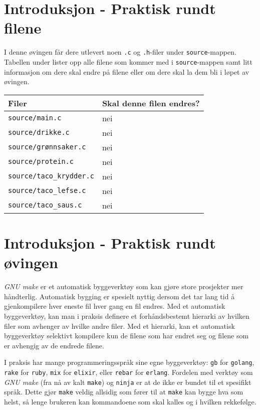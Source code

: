 \begin{alphasection}

\section{Introduksjon - Praktisk rundt filene}

I denne øvingen får dere utlevert noen \verb|.c| og \verb|.h|-filer under \verb|source|-mappen. Tabellen under lister opp alle filene som kommer med i \verb|source|-mappen samt litt informasjon om dere skal endre på filene eller om dere skal la dem bli i løpet av øvingen.

\begin{center}
 \begin{tabular}{|p{8.5cm} p{5.5cm}|} 
 \hline
 \textbf{Filer} & \textbf{Skal denne filen endres?}  \\ [0.5ex] 
 \hline\hline
  \verb|source/main.c| & nei  \\ 
 \hline
 \verb|source/drikke.c| & nei  \\ 
 \hline
 \verb|source/grønnsaker.c| & nei  \\ 
 \hline
 \verb|source/protein.c| & nei  \\ 
 \hline
 \verb|source/taco_krydder.c| & nei  \\
 \hline
 \verb|source/taco_lefse.c| & nei  \\ 
 \hline
  \verb|source/taco_saus.c| & nei  \\ 
 \hline
\end{tabular}
\end{center}

\section{Introduksjon - Praktisk rundt øvingen}

 \textit{GNU make} er et automatisk byggeverktøy som kan gjøre store prosjekter mer håndterlig. Automatisk bygging er spesielt nyttig dersom det tar lang tid å gjenkompilere hver eneste fil hver gang en fil endres. Med et automatisk byggeverktøy, kan man i praksis definere et forhåndsbestemt hierarki av hvilken filer som avhenger av hvilke andre filer. Med et hierarki, kan et automatisk byggeverktøy selektivt kompilere kun de filene som har endret seg og filene som er avhengig av de endrede filene.
 
 I praksis har mange programmeringsspråk sine egne byggeverktøy: \verb|gb| for \verb|golang|, \verb|rake| for \verb|ruby|, \verb|mix| for \verb|elixir|, eller \verb|rebar| for \verb|erlang|. Fordelen med verktøy som \textit{GNU make} (fra nå av kalt \verb|make|) og \verb|ninja| er at de ikke er bundet til et spesifikt språk. Dette gjør \verb|make| veldig allsidig som fører til at \verb|make| kan bygge hva som helst, så lenge brukeren kan kommandoene som skal kalles og i hvilken rekkefølge.
 

\end{alphasection}
